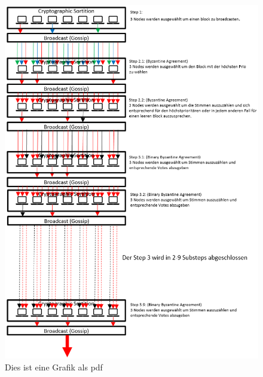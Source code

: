 \documentclass[11pt,a4paper]{article}
\begin{document}
\begin{figure}
	\centering
	\includegraphics[scale=0.65]{Algorand.png}
	\caption{Dies ist eine Grafik als pdf}
	\label{img:grafik-dummy2}
\end{figure}
\end{document}

